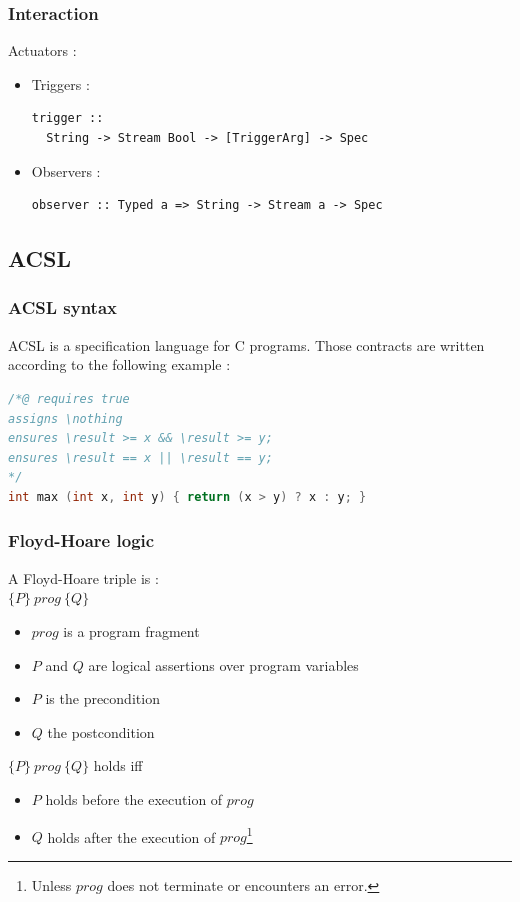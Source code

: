 \documentclass{beamer}
\begin{document}
\begin{frame}[fragile]
  		\frametitle{Interaction}
  		
	Actuators :
  	\begin{itemize}
		\item Triggers : 
\begin{verbatim}
trigger :: 
  String -> Stream Bool -> [TriggerArg] -> Spec
\end{verbatim}
		\item Observers :
\begin{verbatim}
observer :: Typed a => String -> Stream a -> Spec
\end{verbatim}
	\end{itemize}
\end{frame}
  	
  	\subsection{ACSL}
  	\begin{frame}
  		\tableofcontents[currentsubsection,sectionstyle=show/shaded,subsectionstyle=show/shaded/hide]
  	\end{frame}
  	
\begin{frame}[fragile]
	\frametitle{ACSL syntax}
	ACSL is a specification language for C programs. Those contracts are written according to the following example :
\begin{lstlisting}[language=C]
/*@ requires true
assigns \nothing
ensures \result >= x && \result >= y;
ensures \result == x || \result == y;
*/
int max (int x, int y) { return (x > y) ? x : y; }
\end{lstlisting}
	
\end{frame}
  	
\begin{frame}[fragile]
	\frametitle{Floyd-Hoare logic}
	A Floyd-Hoare triple is : \\
	$\lbrace P \rbrace~ prog ~\lbrace Q \rbrace$ \\
	\begin{itemize}
		\item $prog$ is a program fragment
		\item $P$ and $Q$ are logical assertions over program variables 
		\item $P$ is the precondition
		\item $Q$ the postcondition
	\end{itemize}
	
	$\lbrace P \rbrace~ prog ~\lbrace Q \rbrace$ holds iff
	\begin{itemize}
		\item $P$ holds before the execution of $prog$
		\item $Q$ holds after the execution of $prog$\footnote{Unless $prog$ does not terminate or encounters an error.}
	\end{itemize}

\end{frame}
	
\end{document}
